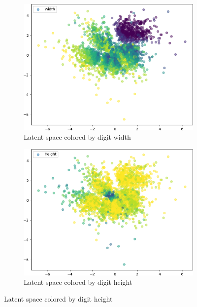 \begin{figure}
\begin{subfigure}{.24\textwidth}
        \label{subfig:vae_mnist_latent_space_length}
    \end{subfigure}
    \hfill
    \begin{subfigure}{.24\textwidth}
        \includegraphics[width=\textwidth]{images/latent_spaces/mnist/vae/embeddings_mu_4.png}
        \caption{Latent space colored by digit width}
        \label{subfig:vae_mnist_latent_space_width}
    \end{subfigure}
    \hfill
    \begin{subfigure}{.24\textwidth}
        \includegraphics[width=\textwidth]{images/latent_spaces/mnist/vae/embeddings_mu_5.png}
        \caption{Latent space colored by digit height}
        \label{subfig:vae_mnist_latent_space_height}
    \end{subfigure}

\end{figure}
